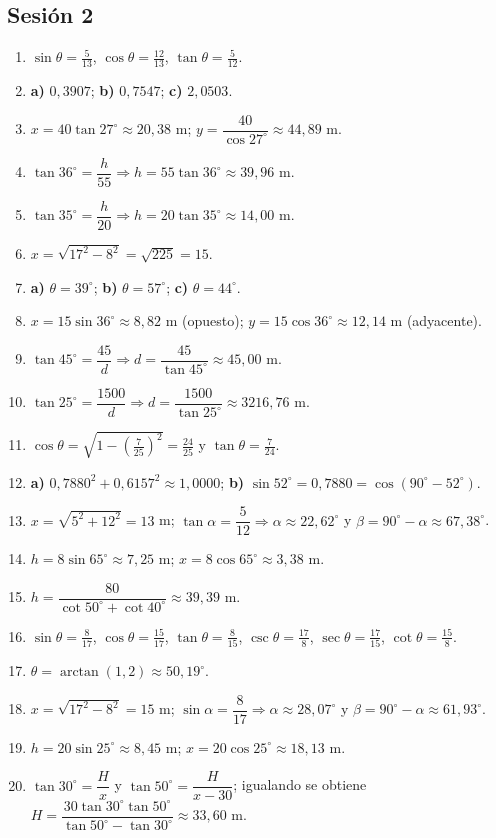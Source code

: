 \documentclass[12pt, letterpaper]{article}
\providecommand{\sen}{\sin}
\begin{document}
\subsection*{Sesión 2}
\begin{enumerate}[leftmargin=*, label=\textbf{\arabic*.}]
  \item $\sen\theta=\frac{5}{13}$, $\cos\theta=\frac{12}{13}$, $\tan\theta=\frac{5}{12}$.
  \item \textbf{a)} $0{,}3907$; \quad \textbf{b)} $0{,}7547$; \quad \textbf{c)} $2{,}0503$.
  \item $x=40\tan 27^{\circ}\approx 20{,}38$ m; $y=\dfrac{40}{\cos 27^{\circ}}\approx 44{,}89$ m.
  \item $\tan 36^{\circ}=\dfrac{h}{55}\Rightarrow h=55\tan 36^{\circ}\approx 39{,}96$ m.
  \item $\tan 35^{\circ}=\dfrac{h}{20}\Rightarrow h=20\tan 35^{\circ}\approx 14{,}00$ m.
  \item $x=\sqrt{17^2-8^2}=\sqrt{225}=15$.
  \item \textbf{a)} $\theta=39^{\circ}$; \quad \textbf{b)} $\theta=57^{\circ}$; \quad \textbf{c)} $\theta=44^{\circ}$.
  \item $x=15\sen 36^{\circ}\approx 8{,}82$ m (opuesto); $y=15\cos 36^{\circ}\approx 12{,}14$ m (adyacente).
  \item $\tan 45^{\circ}=\dfrac{45}{d}\Rightarrow d=\dfrac{45}{\tan 45^{\circ}}\approx 45{,}00$ m.
  \item $\tan 25^{\circ}=\dfrac{1500}{d}\Rightarrow d=\dfrac{1500}{\tan 25^{\circ}}\approx 3216{,}76$ m.
  \item $\cos\theta=\sqrt{1-\left(\frac{7}{25}\right)^2}=\frac{24}{25}$ y $\tan\theta=\frac{7}{24}$.
  \item \textbf{a)} $0{,}7880^2+0{,}6157^2\approx 1{,}0000$; \quad \textbf{b)} $\sen 52^{\circ}=0{,}7880=\cos(90^{\circ}-52^{\circ})$. \checkmark
  \item $x=\sqrt{5^2+12^2}=13$ m; $\tan\alpha=\dfrac{5}{12}\Rightarrow\alpha\approx 22{,}62^{\circ}$ y $\beta=90^{\circ}-\alpha\approx 67{,}38^{\circ}$.
  \item $h=8\sen 65^{\circ}\approx 7{,}25$ m; $x=8\cos 65^{\circ}\approx 3{,}38$ m.
  \item $h=\dfrac{80}{\cot 50^{\circ}+\cot 40^{\circ}}\approx 39{,}39$ m.
  \item $\sen\theta=\frac{8}{17}$, $\cos\theta=\frac{15}{17}$, $\tan\theta=\frac{8}{15}$, $\csc\theta=\frac{17}{8}$, $\sec\theta=\frac{17}{15}$, $\cot\theta=\frac{15}{8}$.
  \item $\theta=\arctan\left(1{,}2\right)\approx 50{,}19^{\circ}$.
  \item $x=\sqrt{17^2-8^2}=15$ m; $\sen\alpha=\dfrac{8}{17}\Rightarrow\alpha\approx 28{,}07^{\circ}$ y $\beta=90^{\circ}-\alpha\approx 61{,}93^{\circ}$.
  \item $h=20\sen 25^{\circ}\approx 8{,}45$ m; $x=20\cos 25^{\circ}\approx 18{,}13$ m.
  \item $\tan 30^{\circ}=\dfrac{H}{x}$ y $\tan 50^{\circ}=\dfrac{H}{x-30}$; igualando se obtiene $H=\dfrac{30\tan 30^{\circ}\tan 50^{\circ}}{\tan 50^{\circ}-\tan 30^{\circ}}\approx 33{,}60$ m.
\end{enumerate}
\end{document}

